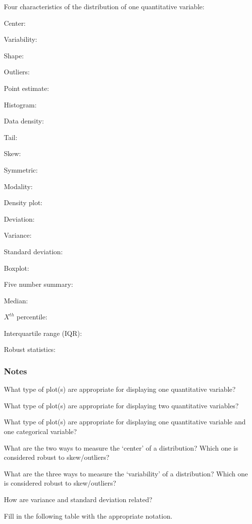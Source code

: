 \documentclass[
]{report}
\newcommand{\rgs}{\vspace{12pt}} %
\newcommand{\rgi}{\hspace{24pt}}  %
\begin{document}
\rgi Four characteristics of the distribution of one quantitative variable:

\rgi Center:
\rgs

\rgi Variability:
\rgs

\rgi Shape:
\rgs

\rgi Outliers:
\rgs

Point estimate:
\rgs

Histogram:
\rgs

Data density:
\rgs

Tail:
\rgs

Skew:
\rgs

Symmetric:
\rgs

Modality:
\rgs

Density plot:
\rgs 

Deviation:
\rgs

Variance:
\rgs

Standard deviation:
\rgs

Boxplot:
\rgs

Five number summary:
\rgs

Median:
\rgs

\(X^{th}\) percentile:
\rgs

Interquartile range (IQR):
\rgs

Robust statistics:
\rgs

\hypertarget{notes-5}{%
\subsubsection*{Notes}\label{notes-5}}

What type of plot(s) are appropriate for displaying one quantitative variable?
\rgs

What type of plot(s) are appropriate for displaying two quantitative variables?
\rgs

What type of plot(s) are appropriate for displaying one quantitative variable and one categorical variable?
\rgs

What are the two ways to measure the `center' of a distribution? Which one is considered robust to skew/outliers?
\rgs

What are the three ways to measure the `variability' of a distribution? Which one is considered robust to skew/outliers?
\rgs

How are variance and standard deviation related?
\rgs

Fill in the following table with the appropriate notation.
\end{document}
